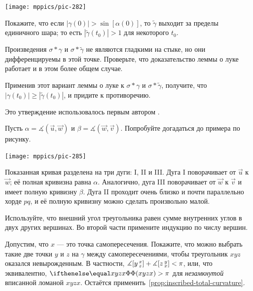 \begin{multicols}{2}
\begin{Figure}
\vskip-1mm
\centering
\texttt{[image: mppics/pic-282]}
\vskip-1mm
\end{Figure}

Покажите, что если $|\gamma(0)|> \sin[\alpha(0)]$, то $\tilde\gamma$ выходит за пределы единичного шара; то есть $|\tilde\gamma(t_0)|>1$ для некоторого $t_0$.

Произведения $\sigma*\gamma$ и $\sigma*\tilde\gamma$ не являются гладкими на стыке, но они дифференцируемы в этой точке.
Проверьте, что доказательство леммы о луке работает и в этом более общем случае.

Применив этот вариант леммы о луке к $\sigma*\gamma$ и $\sigma*\tilde\gamma$, получите, что $|\gamma(t_0)|\ge |\tilde\gamma(t_0)|$, и придите к противоречию.

 Это утверждение использовалось первым автором \cite{petrunin2023}.



\setcounter{eqtn}{0}

Пусть $\alpha=\measuredangle(\vec u,\vec w)$ 
и $\beta=\measuredangle(\vec w,\vec v)$.
Попробуйте догадаться до примера по рисунку.

\begin{Figure}
\vskip-1mm
\centering
\texttt{[image: mppics/pic-285]}
\vskip-1mm
\end{Figure}

Показанная кривая разделена на три дуги: I, II и III. 
Дуга I поворачивает от $\vec u$ к $\vec w$;
её полная кривизна равна $\alpha$.
Аналогично, дуга III поворачивает от $\vec w$ к $\vec v$ и имеет полную кривизну $\beta$. 
Дуга II проходит очень близко и почти параллельно хорде $pq$, и её полную кривизну можно сделать произвольно малой.

Используйте, что внешний угол треугольника равен сумме внутренних углов в двух других вершинах.
Во второй части примените индукцию по числу вершин.

Допустим, что $x$ --- это точка самопересечения.
Покажите, что можно выбрать такие две точки $y$ и $z$ на $\gamma$ между самопересечениями, чтобы треугольник $xyz$ оказался невырожденным.
В частности, 
$\measuredangle\hinge yxz
\z+
\measuredangle\hinge zyx
<\pi$, или, что эквивалентно, $\tc{xyzx}\z>\pi$ для \textit{незамкнутой} вписанной ломаной $xyzx$.
Остаётся применить~\ref{prop:inscribed-total-curvature}.


\end{multicols}
